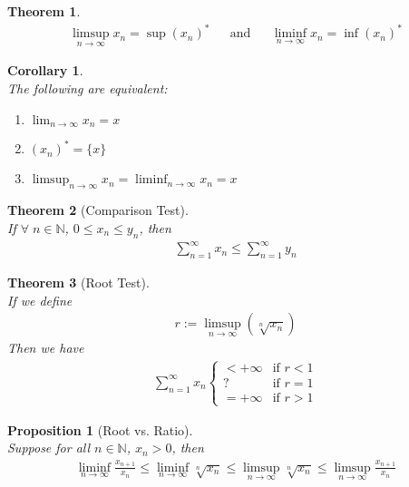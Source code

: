 \documentclass[10pt,a4paper]{article}
\newtheorem{theorem}{Theorem}
\newtheorem{proposition}{Proposition}
\newtheorem{corollary}{Corollary}
\theoremstyle{definition}
\theoremstyle{definition}
\numberwithin{equation}{section}
\numberwithin{theorem}{section}
\numberwithin{proposition}{section}
\numberwithin{lemma}{section}
\numberwithin{corollary}{section}
\begin{document}
\begin{theorem}$ $
\begin{align*}
\limsup_{n \to \infty} x_n = \sup(x_n)^* && \text{and} && \liminf_{n \to \infty} x_n = \inf(x_n)^*
\end{align*}
\end{theorem}

\begin{corollary}$ $
\\The following are equivalent:
\begin{enumerate}
\item $\lim_{n \to \infty} x_n = x$
\item $(x_n)^* = \{x\}$
\item $\limsup_{n \to \infty} x_n = \liminf_{n \to \infty} x_n = x$
\end{enumerate}
\end{corollary}

\begin{theorem}[Comparison Test]$ $
\\If $\forall \; n \in \mathbb{N}$, $0 \leq x_n \leq y_n$, then \begin{align*}
\sum_{n = 1}^\infty x_n \leq \sum_{n = 1}^\infty y_n
\end{align*}
\end{theorem}

\begin{theorem}[Root Test]$ $
\\If we define 
\begin{align*}
r := \limsup_{n \to \infty} \left( \sqrt[n]{x_n} \right)
\end{align*}
Then we have
\begin{align*}
\sum_{n = 1}^\infty x_n \begin{cases}
< +\infty &\text{if $r < 1$}\\
? &\text{if $r = 1$}\\
= +\infty &\text{if $r > 1$}
\end{cases}
\end{align*}
\end{theorem}

\begin{proposition}[Root vs. Ratio]$ $
\\Suppose for all $n \in \mathbb{N}$, $x_n > 0$, then
\begin{align*}
\liminf_{n \to \infty} \frac{x_{n + 1}}{x_n} \leq \liminf_{n \to \infty} \sqrt[n]{x_n} \leq \limsup_{n \to \infty} \sqrt[n]{x_n} \leq \limsup_{n \to \infty} \frac{x_{n+1}}{x_n}
\end{align*}
\end{proposition}
\end{document}
